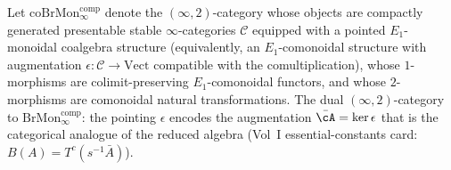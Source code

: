\begin{definition}
\label{def:cy-c-coBrMon-comp-infty}
Let $\mathrm{coBrMon}^{\mathrm{comp}}_\infty$ denote the
$(\infty,2)$-category whose objects are compactly generated presentable
stable $\infty$-categories $\mathcal C$ equipped with a pointed
$E_1$-monoidal coalgebra structure (equivalently, an $E_1$-comonoidal
structure with augmentation $\epsilon : \mathcal C \to \mathrm{Vect}$
compatible with the comultiplication), whose $1$-morphisms are
colimit-preserving $E_1$-comonoidal functors, and whose $2$-morphisms
are comonoidal natural transformations. The dual $(\infty,2)$-category
to $\mathrm{BrMon}^{\mathrm{comp}}_\infty$: the pointing $\epsilon$
encodes the augmentation $\bar \cA = \ker \epsilon$ that is the
categorical analogue of the reduced algebra (Vol~I essential-constants
card: $B(A) = T^c(s^{-1}\bar A)$).
\end{definition}

